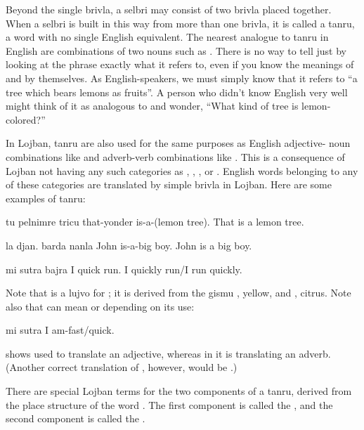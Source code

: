Beyond the single brivla, a selbri may consist of two brivla
    placed together. When a selbri is built in this way from more
    than one brivla, it is called a tanru, a word with no single
    English equivalent. The nearest analogue to tanru in English
    are combinations of two nouns such as . There is
    no way to tell just by looking at the phrase 
    exactly what it refers to, even if you know the meanings of
     and  by themselves. As English-speakers, we
    must simply know that it refers to ``a tree which bears lemons
    as fruits''. A person who didn't know English very well might
    think of it as analogous to  and wonder, ``What
    kind of tree is lemon-colored?''

In Lojban, tanru are also used for the same purposes as
    English adjective- noun combinations like  and
    adverb-verb combinations like . This is a
    consequence of Lojban not having any such categories as
    , , , or . English words
    belonging to any of these categories are translated by simple
    brivla in Lojban. Here are some examples of tanru:
\begin{example}
tu pelnimre tricu\n
that-yonder is-a-(lemon tree).\n
That is a lemon tree.
\end{example}

\begin{example}
la djan. barda nanla\n
John is-a-big boy.\n
John is a big boy.
\end{example}

\begin{example}
mi sutra bajra\n
I quick run.\n
I quickly run/I run quickly.
\end{example}

Note that  is a lujvo for ; it is
    derived from the gismu , yellow, and ,
    citrus. Note also that  can mean  or
     depending on its use:
\begin{example}
mi sutra\n
I am-fast/quick.
\end{example}

{\noindent}shows  used to translate an adjective, whereas in  it is translating an adverb.
    (Another correct translation of , however, would be .) 

There are special Lojban terms for the two components of a
    tanru, derived from the place structure of the word .
    The first component is called the , and the second
    component is called the .

